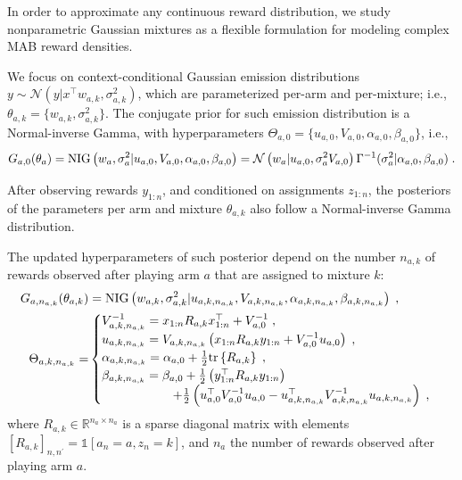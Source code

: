 \documentclass{article}
\def \Real{{\mathbb R}}
\newcommand{\ie}{i.e., }
\newcommand{\N}[1]{\mathcal{N}\left( #1\right)}
\newcommand{\NIG}[1]{{\rm NIG}\left( #1\right)}
\newcommand{\tr}[1]{\mathrm{tr}\left\{ #1 \right\}} %
\begin{document}
In order to approximate any continuous reward distribution, we study nonparametric Gaussian mixtures as a flexible formulation for modeling complex MAB reward densities.

We focus on context-conditional Gaussian emission distributions $y\sim \N{y|x^\top w_{a,k}, \sigma_{a,k}^2}$, which are parameterized per-arm and per-mixture; \ie $\theta_{a,k}=\{w_{a,k}, \sigma_{a,k}^2 \}$. The conjugate prior for such emission distribution is a Normal-inverse Gamma, with hyperparameters $\Theta_{a,0}=\{u_{a,0}, V_{a,0},\alpha_{a,0}, \beta_{a,0}\}$, \ie
\begin{equation}
G_{a,0}(\theta_a)=\NIG{w_a, \sigma_a^2 |u_{a,0}, V_{a,0},\alpha_{a,0}, \beta_{a,0}} = \N{w_a|u_{a,0}, \sigma_a^2 V_{a,0}} \Gamma^{-1}(\sigma_a^2|\alpha_{a,0}, \beta_{a,0}) \;.
\end{equation}

After observing rewards $y_{1:n}$, and conditioned on assignments $z_{1:n}$, the posteriors of the parameters per arm and mixture $\theta_{a,k}$ also follow a Normal-inverse Gamma distribution.

\clearpage
The updated hyperparameters of such posterior depend on the number $n_{a,k}$ of rewards observed after playing arm $a$ that are assigned to mixture $k$:
\begin{equation}
\begin{split}
G_{a,n_{a,k}}(\theta_{a,k})&=\NIG{w_{a,k}, \sigma_{a,k}^2 |u_{a,k,n_{a,k}}, V_{a,k,n_{a,k}},\alpha_{a,k,n_{a,k}}, \beta_{a,k,n_{a,k}}} \;,\\
\Theta_{a,k,n_{a,k}}= &\begin{cases}
V_{a,k,n_{a,k}}^{-1} = x_{1:n} R_{a,k} x_{1:n}^\top + V_{a,0}^{-1} \;,\\
u_{a,k,n_{a,k}}= V_{a,k,n_{a,k}} \left( x_{1:n} R_{a,k} y_{1:n} + V_{a,0}^{-1} u_{a,0}\right) \;, \\
\alpha_{a,k,n_{a,k}} = \alpha_{a,0} + \frac{1}{2} \tr{R_{a,k}} \;, \\
\beta_{a,k,n_{a,k}} = \beta_{a,0} + \frac{1}{2}\left(y_{1:n}^\top R_{a,k}y_{1:n} \right) \\
\hspace*{2cm}+ \frac{1}{2}\left( u_{a,0}^\top V_{a,0}^{-1} u_{a,0} - u_{a,k,n_{a,k}}^\top V_{a,k,n_{a,k}}^{-1} u_{a,k,n_{a,k}} \right) \; ,
\end{cases}
\end{split}
\label{eq:posterior_hyperparameters}
\end{equation}
where $R_{a,k}\in\Real^{n_a\times n_a}$ is a sparse diagonal matrix with elements $\left[R_{a,k}\right]_{n,n^\prime}=\mathds{1}[a_n=a,z_n=k]$, and $n_{a}$ the number of rewards observed after playing arm $a$.
\end{document}
